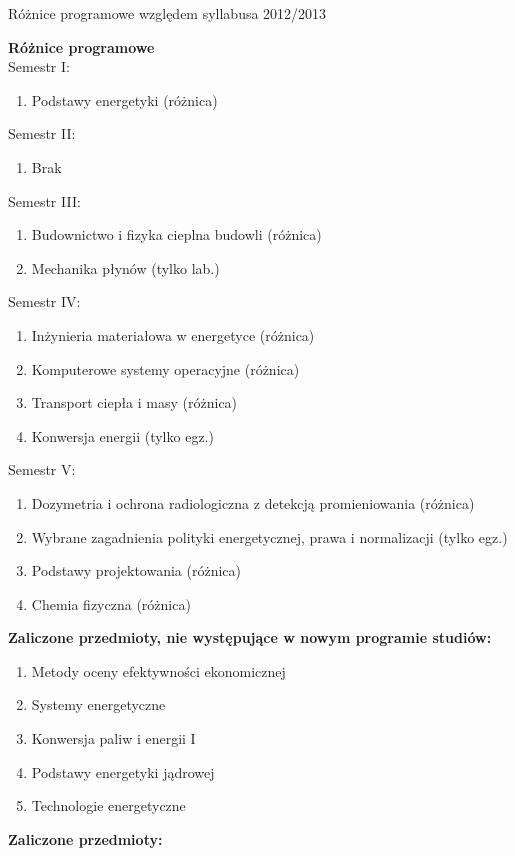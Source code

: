 \documentclass[a4paper,12pt]{article}
\begin{document}
\begin{center}
\Large{Różnice programowe względem syllabusa 2012/2013}
\end{center}
\vspace{20pt}
\textbf{Różnice programowe}\\
Semestr I:
\begin{enumerate}
\item Podstawy energetyki (różnica)
\end{enumerate}
Semestr II:
\begin{enumerate}
\item Brak
\end{enumerate}
Semestr III:
\begin{enumerate}
\item Budownictwo i fizyka cieplna budowli (różnica)
\item Mechanika płynów (tylko lab.)
\end{enumerate}
Semestr IV:
\begin{enumerate}
\item Inżynieria materiałowa w energetyce (różnica)
\item Komputerowe systemy operacyjne (różnica)
\item Transport ciepła i masy (różnica)
\item Konwersja energii (tylko egz.)
\end{enumerate}
Semestr V:
\begin{enumerate}
\item Dozymetria i ochrona radiologiczna z detekcją promieniowania (różnica)
\item Wybrane zagadnienia polityki energetycznej, prawa i normalizacji (tylko egz.)
\item Podstawy projektowania (różnica)
\item Chemia fizyczna (różnica)
\end{enumerate}
\vspace{20pt}
\textbf{Zaliczone przedmioty, nie występujące w nowym programie studiów:}
\begin{enumerate}
\item Metody oceny efektywności ekonomicznej
\item Systemy energetyczne
\item Konwersja paliw i energii I
\item Podstawy energetyki jądrowej
\item Technologie energetyczne
\end{enumerate}
\newpage
\textbf{Zaliczone przedmioty:}
\end{document}
